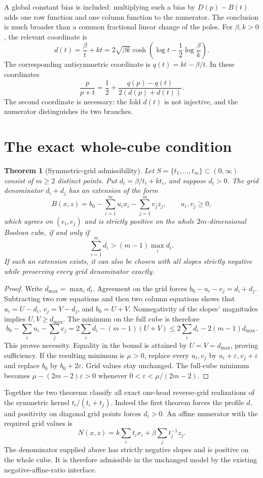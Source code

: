 \documentclass[11pt]{article}
\newtheorem{theorem}{Theorem}
\begin{document}
A global constant bias is included: multiplying such a bias by
$D(p)-B(t)$ adds one row function and one column function to the
numerator. The conclusion is much broader than a common fractional
linear change of the poles. For $\beta,k>0$, the relevant coordinate is
\[
 d(t)=\frac\beta t+kt
      =2\sqrt{\beta k}\cosh\!\left(\log t-
                   \frac12\log\frac\beta k\right).
\]
The corresponding antisymmetric coordinate is
$q(t)=kt-\beta/t$. In these coordinates
\[
 \frac{p}{p+t}=\frac12+
       \frac{q(p)-q(t)}{2(d(p)+d(t))}.
\]
The second coordinate is necessary: the fold $d(t)$ is not injective,
and the numerator distinguishes its two branches.

\section{The exact whole-cube condition}

\begin{theorem}[Symmetric-grid admissibility]
Let $S=\{t_1,\ldots,t_m\}\subset(0,\infty)$ consist of $m\ge2$
distinct points. Put $d_i=\beta/t_i+kt_i$, and suppose $d_i>0$.
The grid denominator $d_i+d_j$ has an extension of the form
\[
 B(x,z)=b_0-\sum_{i=1}^m u_i x_i-\sum_{j=1}^m v_jz_j,
 \qquad u_i,v_j\ge0,
\]
which agrees on $(e_i,e_j)$ and is strictly positive on the whole
$2m$-dimensional Boolean cube, if and only if
\[
 \sum_{i=1}^m d_i>(m-1)\max_i d_i.
\]
If such an extension exists, it can also be chosen with all slopes
strictly negative while preserving every grid denominator exactly.
\end{theorem}

\begin{proof}
Write $d_{\max}=\max_i d_i$. Agreement on the grid forces
$b_0-u_i-v_j=d_i+d_j$. Subtracting two row equations and then two
column equations shows that $u_i=U-d_i$, $v_j=V-d_j$, and
$b_0=U+V$. Nonnegativity of the slopes' magnitudes implies
$U,V\ge d_{\max}$. The minimum on the full cube is therefore
\[
 b_0-\sum_i u_i-\sum_jv_j
 =2\sum_i d_i-(m-1)(U+V)
 \le 2\sum_i d_i-2(m-1)d_{\max}.
\]
This proves necessity. Equality in the bound is attained by
$U=V=d_{\max}$, proving sufficiency.
If the resulting minimum is $\mu>0$, replace every $u_i,v_j$ by
$u_i+\varepsilon,v_j+\varepsilon$ and replace $b_0$ by
$b_0+2\varepsilon$. Grid values stay unchanged. The full-cube
minimum becomes $\mu-(2m-2)\varepsilon>0$ whenever
$0<\varepsilon<\mu/(2m-2)$.
\end{proof}

Together the two theorems classify all exact one-head reverse-grid
realizations of the symmetric kernel $t_i/(t_i+t_j)$. Indeed the first
theorem forces the profile $d$, and positivity on diagonal grid points
forces $d_i>0$. An affine numerator with the required grid values is
\[
 N(x,z)=k\sum_i t_i x_i+\beta\sum_j t_j^{-1}z_j.
\]
The denominator supplied above has strictly negative slopes and is
positive on the whole cube. It is therefore admissible in the unchanged
model by the existing negative-affine-ratio interface.
\end{document}
